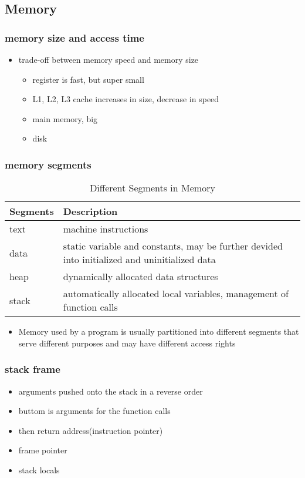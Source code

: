 \documentclass[11pt]{article}
\begin{document}
\subsection{Memory}
\label{sec:orgb22ed16}
\subsubsection{memory size and access time}
\label{sec:org015a105}
\begin{itemize}
\item trade-off between memory speed and memory size
\begin{itemize}
\item register is fast, but super small
\item L1, L2, L3 cache increases in size, decrease in speed
\item main memory, big
\item disk
\end{itemize}
\end{itemize}
\subsubsection{memory segments}
\label{sec:org7e61dcb}
\begin{table}[htbp]
\caption{Different Segments in Memory}
\centering
\begin{tabular}{ll}
Segments & Description\\
\hline
text & machine instructions\\
data & static variable and constants, may be further devided into initialized and uninitialized data\\
heap & dynamically allocated data structures\\
stack & automatically allocated local variables, management of function calls\\
\end{tabular}
\end{table}
\begin{itemize}
\item Memory used by a program is usually partitioned into different segments that serve different purposes and may have different access rights
\end{itemize}
\subsubsection{stack frame}
\label{sec:orgf91510d}
\begin{itemize}
\item arguments pushed onto the stack in a reverse order
\item buttom is arguments for the function calls
\item then return address(instruction pointer)
\item frame pointer
\item stack locals
\end{itemize}
\end{document}
